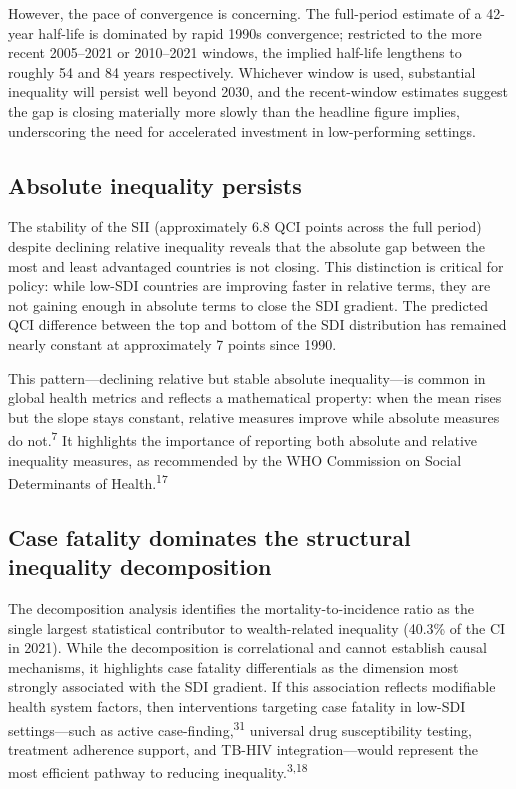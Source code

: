 \documentclass[12pt]{article}
\begin{document}
However, the pace of convergence is concerning. The full-period estimate of a 42-year half-life is dominated by rapid 1990s convergence; restricted to the more recent 2005--2021 or 2010--2021 windows, the implied half-life lengthens to roughly 54 and 84 years respectively. Whichever window is used, substantial inequality will persist well beyond 2030, and the recent-window estimates suggest the gap is closing materially more slowly than the headline figure implies, underscoring the need for accelerated investment in low-performing settings.

\subsection{Absolute inequality persists}

The stability of the SII (approximately 6.8 QCI points across the full period) despite declining relative inequality reveals that the absolute gap between the most and least advantaged countries is not closing. This distinction is critical for policy: while low-SDI countries are improving faster in relative terms, they are not gaining enough in absolute terms to close the SDI gradient. The predicted QCI difference between the top and bottom of the SDI distribution has remained nearly constant at approximately 7 points since 1990.

This pattern---declining relative but stable absolute inequality---is common in global health metrics and reflects a mathematical property: when the mean rises but the slope stays constant, relative measures improve while absolute measures do not.\textsuperscript{7} It highlights the importance of reporting both absolute and relative inequality measures, as recommended by the WHO Commission on Social Determinants of Health.\textsuperscript{17}

\subsection{Case fatality dominates the structural inequality decomposition}

The decomposition analysis identifies the mortality-to-incidence ratio as the single largest statistical contributor to wealth-related inequality (40.3\% of the CI in 2021). While the decomposition is correlational and cannot establish causal mechanisms, it highlights case fatality differentials as the dimension most strongly associated with the SDI gradient. If this association reflects modifiable health system factors, then interventions targeting case fatality in low-SDI settings---such as active case-finding,\textsuperscript{31} universal drug susceptibility testing, treatment adherence support, and TB-HIV integration---would represent the most efficient pathway to reducing inequality.\textsuperscript{3,18}
\end{document}
